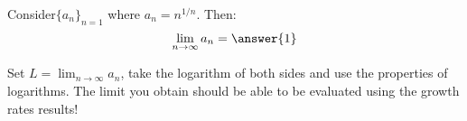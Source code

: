\documentclass{ximera}
\author{Jim Talamo}
\begin{document}
\begin{exercise}

Consider$\{a_n \}_{n=1}$ where $a_n =n^{1/n}$.  Then:
\[
\lim_{n \to \infty} a_n = \answer{1}
\]

\begin{hint}
Set $L = \lim_{n \to \infty} a_n$, take the logarithm of both sides and use the properties of logarithms.  The limit you obtain should be able to be evaluated using the growth rates results!
\end{hint}

\end{exercise}
\end{document}
